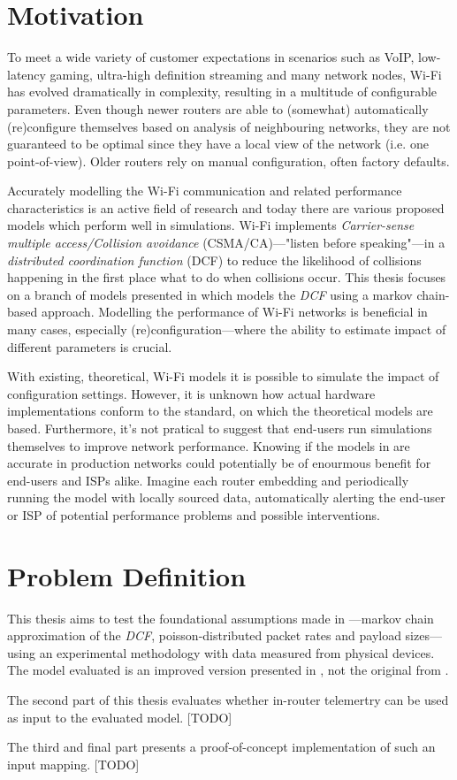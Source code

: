 \section{Motivation} 

To meet a wide variety of customer expectations in scenarios such as VoIP,
low-latency gaming, ultra-high definition streaming and many network nodes,
Wi-Fi has evolved dramatically in complexity, resulting in a multitude of
configurable parameters. Even though newer routers are able to (somewhat)
automatically (re)configure themselves based on analysis of neighbouring
networks, they are not guaranteed to be optimal since they have a local view
of the network (i.e. one point-of-view). Older routers rely on manual
configuration, often factory defaults. 

Accurately modelling the Wi-Fi communication and related performance
characteristics is an active field of research and today there are various
proposed models which perform well in simulations. Wi-Fi implements
\emph{Carrier-sense multiple access/Collision avoidance} (CSMA/CA)—"listen
before speaking"—in a \emph{distributed coordination function} (DCF) to reduce
the likelihood of collisions happening in the first place what to do when
collisions occur.  This thesis focuses on a branch of models presented in
\cite{bianchi} which models the \emph{DCF} using a markov chain-based
approach. Modelling the performance of Wi-Fi networks is beneficial in many
cases, especially (re)configuration—where the ability to estimate impact of
different parameters is crucial. 

With existing, theoretical, Wi-Fi models it is possible to simulate the impact
of configuration settings. However, it is unknown how actual hardware
implementations conform to the standard, on which the theoretical models are
based. Furthermore, it's not pratical to suggest that end-users run
simulations themselves to improve network performance. Knowing if the models
in \cite{felemban} are accurate in production networks could potentially be of
enourmous benefit for end-users and ISPs alike. Imagine each router embedding
and periodically running the model with locally sourced data, automatically
alerting the end-user or ISP of potential performance problems and possible
interventions.

\section{Problem Definition}

This thesis aims to test the foundational assumptions made in
\cite{bianchi}—markov chain approximation of the \emph{DCF},
poisson-distributed packet rates and payload sizes—using an experimental
methodology with data measured from physical devices. The model evaluated is
an improved version presented in \cite{felemban}, not the original from
\cite{bianchi}.

The second part of this thesis evaluates whether in-router telemertry can be
used as input to the evaluated model. [TODO]

The third and final part presents a proof-of-concept implementation of such an
input mapping. [TODO]
